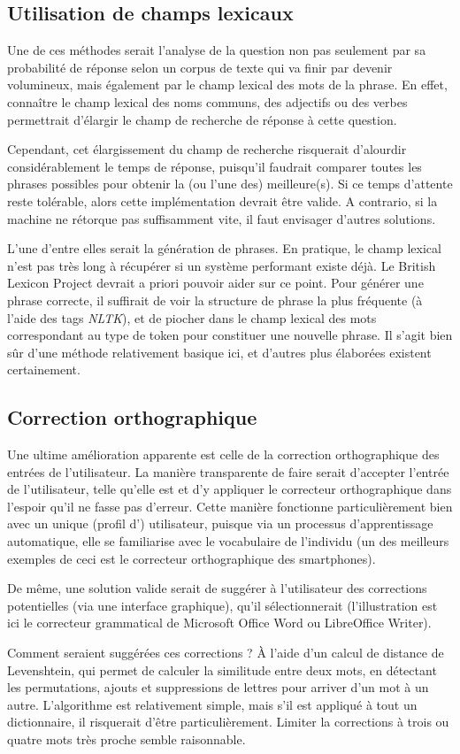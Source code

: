 \subsection{Utilisation de champs lexicaux}%
	Une de ces méthodes serait l'analyse de la question non pas seulement par sa probabilité de réponse selon un corpus de texte qui va finir par devenir volumineux, mais également par le champ lexical des mots de la phrase. En effet, connaître le champ lexical des noms communs, des adjectifs ou des verbes permettrait d'élargir le champ de recherche de réponse à cette question.

	Cependant, cet élargissement du champ de recherche risquerait d'alourdir considérablement le temps de réponse, puisqu'il faudrait comparer toutes les phrases possibles pour obtenir la (ou l'une des) meilleure(s). Si ce temps d'attente reste tolérable, alors cette implémentation devrait être valide. A contrario, si la machine ne rétorque pas suffisamment vite, il faut envisager d'autres solutions.

	L'une d'entre elles serait la génération de phrases. En pratique, le champ lexical n'est pas très long à récupérer si un système performant existe déjà. Le British Lexicon Project devrait a priori pouvoir aider sur ce point. Pour générer une phrase correcte, il suffirait de voir la structure de phrase la plus fréquente (à l'aide des tags \textit{NLTK}), et de piocher dans le champ lexical des mots correspondant au type de token pour constituer une nouvelle phrase. Il s'agit bien sûr d'une méthode relativement basique ici, et d'autres plus élaborées existent certainement.

\subsection{Correction orthographique}
Une ultime amélioration apparente est celle de la correction orthographique des entrées de l'utilisateur. La manière transparente de faire serait d'accepter l'entrée de l'utilisateur, telle qu'elle est et d'y appliquer le correcteur orthographique dans l'espoir qu'il ne fasse pas d'erreur. Cette manière fonctionne particulièrement bien avec un unique (profil d') utilisateur, puisque via un processus d'apprentissage automatique, elle se familiarise avec le vocabulaire de l'individu (un des meilleurs exemples de ceci est le correcteur orthographique des smartphones).

De même, une solution valide serait de suggérer à l'utilisateur des corrections potentielles (via une interface graphique), qu'il sélectionnerait (l'illustration est ici le correcteur grammatical de Microsoft Office Word ou LibreOffice Writer).

Comment seraient suggérées ces corrections ? À l'aide d'un calcul de distance de Levenshtein, qui permet de calculer la similitude entre deux mots, en détectant les permutations, ajouts et suppressions de lettres pour arriver d'un mot à un autre. L'algorithme est relativement simple, mais s'il est appliqué à tout un dictionnaire, il risquerait d'être particulièrement. Limiter la corrections à trois ou quatre mots très proche semble raisonnable.